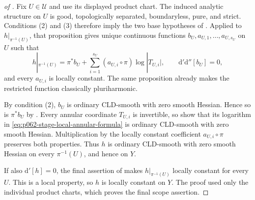 \begin{proof}[of
]
Fix $U\in\mathcal U$ and use its displayed product chart.  The induced
analytic structure on $U$ is good, topologically separated, boundaryless,
pure, and strict.  Conditions \textup{(2)} and \textup{(3)} therefore imply
the two base hypotheses of
.  Applied to
$h|_{\pi^{-1}(U)}$, that proposition gives unique continuous functions
$b_U,a_{U,1},\ldots,a_{U,s_U}$ on $U$ such that
\begin{equation}
\label{eq:p062-stage-local-annular-formula}
 h|_{\pi^{-1}(U)}
 =\pi^*b_U+
   \sum_{i=1}^{s_U}(a_{U,i}\circ\pi)\log|T_{U,i}|,
 \qquad \mathrm d'\mathrm d''[b_U]=0,
\end{equation}
and every $a_{U,i}$ is locally constant.  The same proposition already
makes the restricted function classically pluriharmonic.

By condition \textup{(2)}, $b_U$ is ordinary CLD-smooth with zero smooth
Hessian.  Hence so is $\pi^*b_U$ by
.  Every annular coordinate $T_{U,i}$ is
invertible, so
 show that its logarithm
in \eqref{eq:p062-stage-local-annular-formula} is ordinary CLD-smooth with
zero smooth Hessian.  Multiplication by the locally constant coefficient
$a_{U,i}\circ\pi$ preserves both properties.  Thus $h$ is ordinary
CLD-smooth with zero smooth Hessian on every $\pi^{-1}(U)$, and hence on
$Y$.

If also $\mathrm d'[h]=0$, the final assertion of
 makes
$h|_{\pi^{-1}(U)}$ locally constant for every $U$.  This is a local
property, so $h$ is locally constant on $Y$.  The proof used only the
individual product charts, which proves the final scope assertion.
\end{proof}

